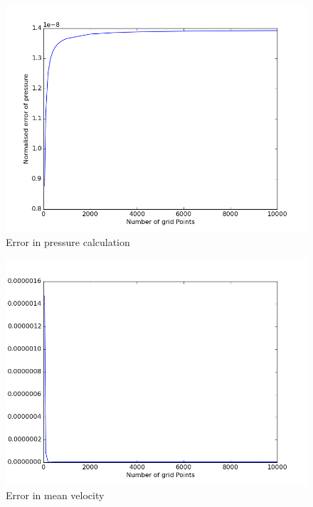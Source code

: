 \documentclass[11pt, a4paper]{article}
\begin{document}
\begin{figure}[H]
 \centering
 \includegraphics[width = \textwidth]{Q6pressure.png}
 \caption{Error in pressure calculation}
 \label{fig:pressure error}
\end{figure}

\begin{figure}[H]
 \centering
 \includegraphics[width = \textwidth]{Q6vel.png}
 \caption{Error in mean velocity}
 \label{fig:vmean error}
\end{figure}
\end{document}
